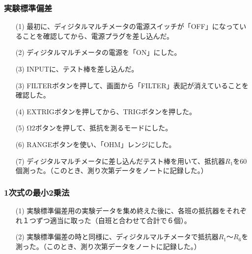 \documentclass[10pt,a4paper]{jsarticle}
\numberwithin{equation}{section}
\numberwithin{figure}{section}
\numberwithin{table}{section}
\begin{document}
      \subsubsection{実験標準偏差}
        \begin{itemize}
          \item [(1)]最初に、ディジタルマルチメータの電源スイッチが「OFF」になっていることを確認してから、電源プラグを差し込んだ。
          \item [(2)]ディジタルマルチメータの電源を「ON」にした。
          \item [(3)]INPUTに、テスト棒を差し込んだ。
          \item [(3)]FILTERボタンを押して、画面から「FILTER」表記が消えていることを確認した。
          \item [(4)]EXTRIGボタンを押してから、TRIGボタンを押した。
          \item [(5)]$\si{\ohm}2$ボタンを押して、抵抗を測るモードにした。
          \item [(6)]RANGEボタンを使い、「OHM」レンジにした。
          \item [(7)]ディジタルマルチメータに差し込んだテスト棒を用いて、抵抗器$R_1$を60個測った。（このとき、測り次第データをノートに記録した。）
        \end{itemize}
      \subsubsection{1次式の最小2乗法}
        \begin{itemize}
          \item [(1)]実験標準偏差用の実験データを集め終えた後に、各班の抵抗器をそれぞれ１つずつ適当に取った（自班と合わせて合計で６個）。
          \item [(2)]実験標準偏差の時と同様に、ディジタルマルチメータで抵抗器$R_1～R_6$を測った。（このとき、測り次第データをノートに記録した。）
        \end{itemize}
\end{document}
